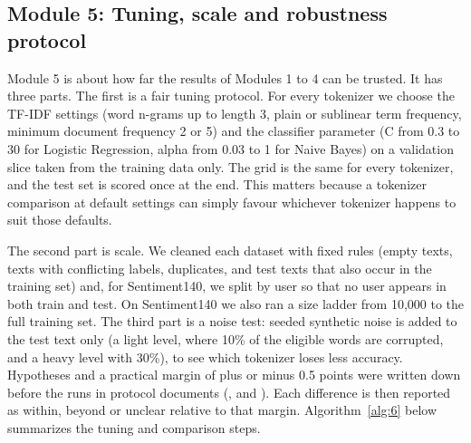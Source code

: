 \documentclass[journal,onecolumn,12pt,a4paper]{IEEEtran}
\begin{document}
\subsection{Module 5: Tuning, scale and robustness protocol}\label{sec:3.7}
Module 5 is about how far the results of Modules 1 to 4 can be trusted. It has three parts. The first is a fair tuning protocol. For every tokenizer we choose the TF-IDF settings (word n-grams up to length 3, plain or sublinear term frequency, minimum document frequency 2 or 5) and the classifier parameter (C from 0.3 to 30 for Logistic Regression, alpha from 0.03 to 1 for Naive Bayes) on a validation slice taken from the training data only. The grid is the same for every tokenizer, and the test set is scored once at the end. This matters because a tokenizer comparison at default settings can simply favour whichever tokenizer happens to suit those defaults.

The second part is scale. We cleaned each dataset with fixed rules (empty texts, texts with conflicting labels, duplicates, and test texts that also occur in the training set) and, for Sentiment140, we split by user so that no user appears in both train and test. On Sentiment140 we also ran a size ladder from 10,000 to the full training set. The third part is a noise test: seeded synthetic noise is added to the test text only (a light level, where 10\% of the eligible words are corrupted, and a heavy level with 30\%), to see which tokenizer loses less accuracy. Hypotheses and a practical margin of plus or minus 0.5 points were written down before the runs in protocol documents (,  and ). Each difference is then reported as within, beyond or unclear relative to that margin. Algorithm~\ref{alg:6} below summarizes the tuning and comparison steps.
\end{document}
